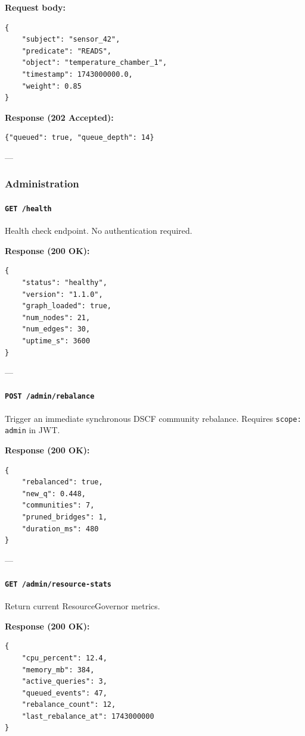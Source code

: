 \documentclass[11pt,article,oneside]{memoir}
\begin{document}
\textbf{Request body:}
\begin{lstlisting}
{
    "subject": "sensor_42",
    "predicate": "READS",
    "object": "temperature_chamber_1",
    "timestamp": 1743000000.0,
    "weight": 0.85
}
\end{lstlisting}

\textbf{Response (202 Accepted):}
\begin{lstlisting}
{"queued": true, "queue_depth": 14}
\end{lstlisting}

---

\subsubsection{Admini\-stration}

\paragraph{\texttt{GET /health}}
Health check endpoint. No authe\-ntication required.

\textbf{Response (200 OK):}
\begin{lstlisting}
{
    "status": "healthy",
    "version": "1.1.0",
    "graph_loaded": true,
    "num_nodes": 21,
    "num_edges": 30,
    "uptime_s": 3600
}
\end{lstlisting}

---

\paragraph{\texttt{POST /admin/rebalance}}
Trigger an immediate synchronous DSCF community rebalance. Requires \texttt{scope: admin} in JWT.

\textbf{Response (200 OK):}
\begin{lstlisting}
{
    "rebalanced": true,
    "new_q": 0.448,
    "communities": 7,
    "pruned_bridges": 1,
    "duration_ms": 480
}
\end{lstlisting}

---

\paragraph{\texttt{GET /admin/resource-stats}}
Return current ResourceGovernor metrics.

\textbf{Response (200 OK):}
\begin{lstlisting}
{
    "cpu_percent": 12.4,
    "memory_mb": 384,
    "active_queries": 3,
    "queued_events": 47,
    "rebalance_count": 12,
    "last_rebalance_at": 1743000000
}
\end{lstlisting}
\end{document}
